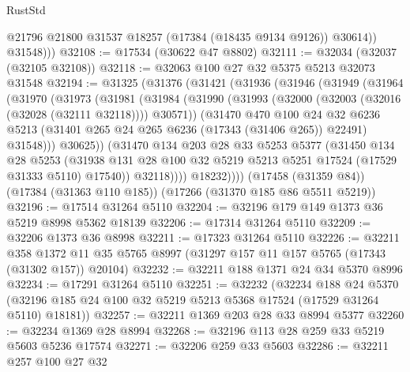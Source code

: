 \begin{lexlean}{RustStd}
\begin{coremodule}
              @21796
              @21800
              @31537
              @18257
              (@17384 (@18435 @9134 @9126))
              @30614))
          @31548)))
@32108 := @17534 (@30622 @47 @8802)
@32111 := @32034 (@32037 (@32105 @32108))
@32118 := @32063 @100 @27 @32 @5375 @5213 @32073 @31548
@32194 := @31325
    (@31376
      (@31421
        (@31936
          (@31946
            (@31949
              (@31964
                (@31970
                  (@31973
                    (@31981
                      (@31984
                        (@31990
                          (@31993 (@32000 (@32003 (@32016 (@32028 (@32111 @32118)))) @30571))
                          (@31470
                            @470
                            @100
                            @24
                            @32
                            @6236
                            @5213
                            (@31401 @265 @24 @265 @6236 (@17343 (@31406 @265)) @22491)
                            @31548)))
                      @30625))
                  (@31470
                    @134
                    @203
                    @28
                    @33
                    @5253
                    @5377
                    (@31450
                      @134
                      @28
                      @5253
                      (@31938
                        @131
                        @28
                        @100
                        @32
                        @5219
                        @5213
                        @5251
                        @17524
                        (@17529 @31333 @5110)
                        @17540))
                    @32118))))
            @18232))))
    (@17458 (@31359 @84))
    (@17384 (@31363 @110 @185))
    (@17266 (@31370 @185 @86 @5511 @5219))
@32196 := @17514 @31264 @5110
@32204 := @32196 @179 @149 @1373 @36 @5219 @8998 @5362 @18139
@32206 := @17314 @31264 @5110
@32209 := @32206 @1373 @36 @8998
@32211 := @17323 @31264 @5110
@32226 := @32211
    @358
    @1372
    @11
    @35
    @5765
    @8997
    (@31297 @157 @11 @157 @5765 (@17343 (@31302 @157)) @20104)
@32232 := @32211 @188 @1371 @24 @34 @5370 @8996
@32234 := @17291 @31264 @5110
@32251 := @32232
    (@32234
      @188
      @24
      @5370
      (@32196 @185 @24 @100 @32 @5219 @5213 @5368 @17524 (@17529 @31264 @5110) @18181))
@32257 := @32211 @1369 @203 @28 @33 @8994 @5377
@32260 := @32234 @1369 @28 @8994
@32268 := @32196 @113 @28 @259 @33 @5219 @5603 @5236 @17574
@32271 := @32206 @259 @33 @5603
@32286 := @32211
    @257
    @100
    @27
    @32

\end{coremodule}
\end{lexlean}

